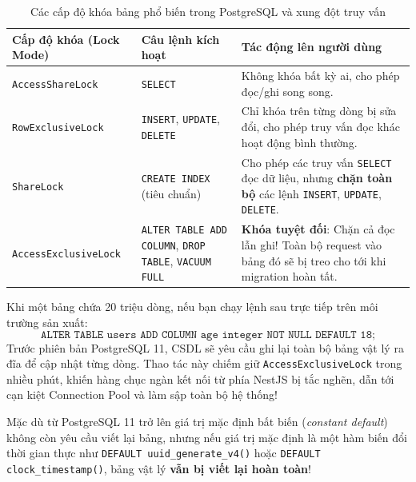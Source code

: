 \documentclass[12pt,a4paper,oneside]{book}
\begin{document}
\begin{table}[htbp]
  \centering
  \small
  \caption{Các cấp độ khóa bảng phổ biến trong PostgreSQL và xung đột truy vấn}
  \label{tab:pg-locks}
  \begin{tabularx}{\textwidth}{p{3.8cm} p{4.2cm} X}
    \toprule
    \textbf{Cấp độ khóa (Lock Mode)} & \textbf{Câu lệnh kích hoạt} & \textbf{Tác động lên người dùng} \\
    \midrule
    \texttt{AccessShareLock} & \texttt{SELECT} & Không khóa bất kỳ ai, cho phép đọc/ghi song song. \\
    \texttt{RowExclusiveLock} & \texttt{INSERT}, \texttt{UPDATE}, \texttt{DELETE} & Chỉ khóa trên từng dòng bị sửa đổi, cho phép truy vấn đọc khác hoạt động bình thường. \\
    \texttt{ShareLock} & \texttt{CREATE INDEX} (tiêu chuẩn) & Cho phép các truy vấn \texttt{SELECT} đọc dữ liệu, nhưng \textbf{chặn toàn bộ} các lệnh \texttt{INSERT}, \texttt{UPDATE}, \texttt{DELETE}. \\
    \texttt{AccessExclusiveLock} & \texttt{ALTER TABLE ADD COLUMN}, \texttt{DROP TABLE}, \texttt{VACUUM FULL} & \textbf{Khóa tuyệt đối}: Chặn cả đọc lẫn ghi! Toàn bộ request vào bảng đó sẽ bị treo cho tới khi migration hoàn tất. \\
    \bottomrule
  \end{tabularx}
\end{table}

\begin{warningbox}
  Khi một bảng chứa 20 triệu dòng, nếu bạn chạy lệnh sau trực tiếp trên môi trường sản xuất:
  \begin{equation}
    \texttt{ALTER TABLE users ADD COLUMN age integer NOT NULL DEFAULT 18;}
  \end{equation}
  Trước phiên bản PostgreSQL 11, CSDL sẽ yêu cầu ghi lại toàn bộ bảng vật lý ra đĩa để cập nhật từng dòng. Thao tác này chiếm giữ \texttt{AccessExclusiveLock} trong nhiều phút, khiến hàng chục ngàn kết nối từ phía NestJS bị tắc nghẽn, dẫn tới cạn kiệt Connection Pool và làm sập toàn bộ hệ thống!
  
  Mặc dù từ PostgreSQL 11 trở lên giá trị mặc định bất biến (\textit{constant default}) không còn yêu cầu viết lại bảng, nhưng nếu giá trị mặc định là một hàm biến đổi thời gian thực như \texttt{DEFAULT uuid\_generate\_v4()} hoặc \texttt{DEFAULT clock\_timestamp()}, bảng vật lý \textbf{vẫn bị viết lại hoàn toàn}!
\end{warningbox}
\end{document}
